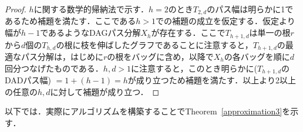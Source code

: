 \documentclass[master]{kuisthesis}		%
\theoremstyle{plain}
\theoremstyle{definition}
\begin{document}
\begin{proof}
    $h$に関する数学的帰納法で示す．$h=2$のとき$T_{2, d}$のパス幅は明らかに1であるため補題を満たす．ここである$h > 1$での補題の成立を仮定する．仮定より幅が$h-1$であるようなDAGパス分解$X_h$が存在する．ここで$T_{h+1, d}$は単一の根$r$から$d$個の$T_{h, d}$の根に枝を伸ばしたグラフであることに注意すると，$T_{h+1, d}$の最適なパス分解は，はじめに$r$の根をバッグに含め，以降で$X_h$の各バッグを順に$d$回分つなげたものである．$h, d > 1$に注意すると，このとき明らかに($T_{h+1, d}$のDADパス幅) $= 1 + (h-1) = h$が成り立つため補題を満たす．以上より2以上の任意の$h, d$に対して補題が成り立つ．
\end{proof}



以下では．実際にアルゴリズムを構築することでTheorem~\ref{approximation3}を示す．
\end{document}
